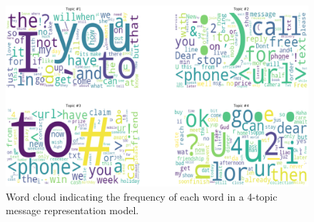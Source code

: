 \documentclass[letterpaper]{article}
\begin{document}
\begin{figure}[p]
	\centering
	\includegraphics[width = 0.95 \linewidth]{./topics_visualization/word_cloud.png}
	\caption{Word cloud indicating the frequency of each word in a 4-topic message representation model.}
	\label{fig: word_cloud}
\end{figure}
\end{document}
